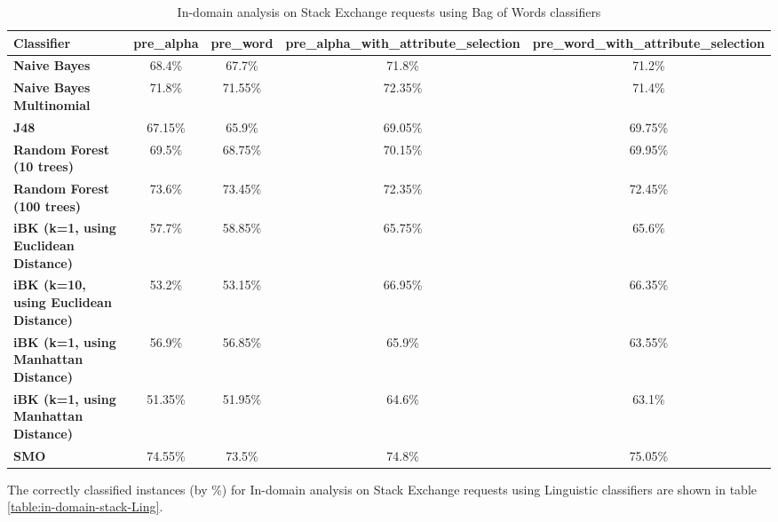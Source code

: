 \documentclass[conference]{IEEEtran}
\begin{document}
\begin{table*}[htbp]
\caption{In-domain analysis on Stack Exchange requests using Bag of Words classifiers }
\centering
\vspace{5pt}
\begin{tabular}{|l|c|c|c|c|}
\hline
\textbf{Classifier} & \textbf{pre\_alpha} & \textbf{pre\_word} & \textbf{pre\_alpha\_with\_attribute\_selection} & \textbf{pre\_word\_with\_attribute\_selection} \\
\hline\hline
\textbf{Naive Bayes} & 68.4\% & 67.7\% & 71.8\% & 71.2\% \\ 
\hline
\textbf{Naive Bayes Multinomial} & 71.8\% & 71.55\% & 72.35\% & 71.4\% \\ 
\hline
\textbf{J48} & 67.15\% & 65.9\% & 69.05\% & 69.75\% \\ 
\hline
\textbf{Random Forest (10 trees)} & 69.5\% & 68.75\% & 70.15\% & 69.95\% \\ 
\hline
\textbf{Random Forest (100 trees)} & 73.6\% & 73.45\% & 72.35\% & 72.45\% \\ 
\hline
\textbf{iBK (k=1, using Euclidean Distance)} & 57.7\% & 58.85\% & 65.75\% & 65.6\% \\ 
\hline
\textbf{iBK (k=10, using Euclidean Distance)} & 53.2\% & 53.15\% & 66.95\% & 66.35\% \\ 
\hline
\textbf{iBK (k=1, using Manhattan Distance)} & 56.9\% & 56.85\% & 65.9\% & 63.55\% \\ 
\hline
\textbf{iBK (k=1, using Manhattan Distance)} & 51.35\% & 51.95\% & 64.6\% & 63.1\% \\ 
\hline
\textbf{SMO} & 74.55\% & 73.5\% & 74.8\% & 75.05\% \\ 
\hline
\hline
\end{tabular}
\label{table:in-domain-stack-BOW}
\end{table*}

The correctly classified instances (by \%) for In-domain analysis on Stack Exchange requests using Linguistic classifiers are shown in table \ref{table:in-domain-stack-Ling}.
\end{document}

